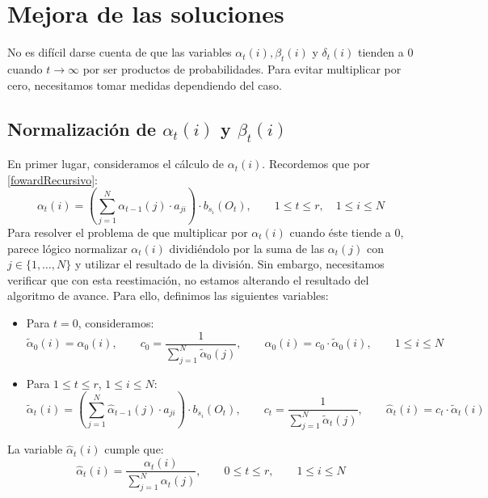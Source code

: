 \section{Mejora de las soluciones}
No es difícil darse cuenta de que las variables $\alpha_t(i), \beta_t(i)$ y $\delta_t(i)$ tienden a $0$ cuando $t\rightarrow\infty$ por ser productos de probabilidades. Para evitar multiplicar por cero, necesitamos tomar medidas dependiendo del caso.
\subsection{Normalización de $\alpha_t(i)$ y $\beta_t(i)$}
En primer lugar, consideramos el cálculo de $\alpha_t(i)$. Recordemos que por \eqref{fowardRecursivo}:
\[\alpha_{t}(i)=\left(\sum_{j=1}^N\alpha_{t-1}(j)\cdot a_{ji}\right)\cdot b_{s_i}(O_{t}), \qquad 1\leq t\leq r , \quad 1\leq i\leq N\]
Para resolver el problema de que multiplicar por $\alpha_t(i)$ cuando éste tiende a $0$, parece lógico normalizar $\alpha_t(i)$ dividiéndolo por la suma de las $\alpha_t(j)$ con $j\in\{1,\dots,N\}$ y utilizar el resultado de la división. Sin embargo, necesitamos verificar que con esta reestimación, no estamos alterando el resultado del algoritmo de avance. Para ello, definimos las siguientes variables:
\begin{itemize}
    \item Para $t=0$, consideramos:
        \begin{equation*}
            \tilde{\alpha}_0(i)=\alpha_0(i), \qquad c_0=\dfrac{1}{\displaystyle\sum_{j=1}^N\tilde{\alpha}_0(j)}, \qquad \hat{\alpha}_0(i)=c_0\cdot\tilde{\alpha}_0(i) ,\qquad 1\leq i\leq N
        \end{equation*}
    \item Para $1\leq t\leq r$, $1\leq i\leq N$:
        \begin{equation*}
            \tilde{\alpha}_t(i)=\left(\sum_{j=1}^N \hat{\alpha}_{t-1}(j)\cdot a_{ji}\right)\cdot b_{s_i}(O_t), \qquad
            c_t=\dfrac{1}{\displaystyle\sum_{j=1}^N\tilde{\alpha}_t(j)}, \qquad
            \hat{\alpha}_t(i)=c_t\cdot\tilde{\alpha}_t(i)
        \end{equation*}
\end{itemize}
\begin{proposition} \label{fórmulaAlphaMejorada}
La variable $\hat{\alpha}_t(i)$ cumple que:
\[\hat{\alpha}_t(i)=\frac{\alpha_t(i)}{\displaystyle\sum_{j=1}^N \alpha_t(j)}, \qquad 0\leq t\leq r, \qquad 1\leq i\leq N \]
\end{proposition}
